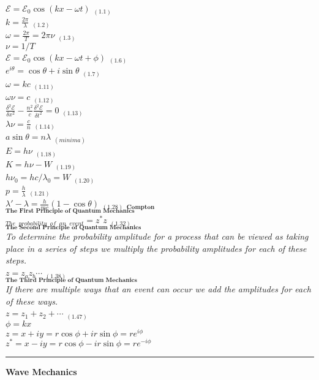 \documentclass[0pt]{report}
\begin{document}
\begin{multicols}{3}
\begin{flushleft}
$\mathcal{E}=\mathcal{E}_0\cos(kx-\omega t)$ $_{(1.1)}$\\
$k=\frac{2\pi}{\lambda}$ $_{(1.2)}$\\
$\omega=\frac{2\pi}{T}=2\pi\nu$ $_{(1.3)}$\\
$\nu=1/T$\\
$\mathcal{E}=\mathcal{E}_0\cos(kx-\omega t+\phi)$ $_{(1.6)}$\\
$e^{i\theta}=\cos\theta+i\sin\theta$ $_{(1.7)}$\\
$\omega=kc$ $_{(1.11)}$\\
$\omega\nu=c$ $_{(1.12)}$\\
$\frac{\delta^2\mathcal{E}}{\delta x^2}-\frac{n^2}{c}\frac{\delta^2\mathcal{E}}{\delta t^2}=0$ $_{(1.13)}$\\
$\lambda\nu=\frac{c}{n}$ $_{(1.14)}$\\
$a\sin\theta=n\lambda$ $_{(minima)}$\\
$E=h\nu$ $_{(1.18)}$\\
$K=h\nu-W$ $_{(1.19)}$\\
$h\nu_0=hc/\lambda_0=W$ $_{(1.20)}$\\
$p=\frac{h}{\lambda}$ $_{(1.21)}$\\
$\lambda'-\lambda=\frac{h}{mc}(1-\cos\theta)$ $_{(1.28)}$ $_{\textbf{Compton}}$\\
$_{\textbf{The First Principle of Quantum Mechanics}}$\\
$_{The}$ $_{probability}$  $_{of}$  $_{an}$ $_{event}=z^*z$ $_{(1.32)}$\\
$_{\textbf{The Second Principle of Quantum Mechanics}}$\\
\textit{To determine the probability amplitude for a process that can be viewed as taking place in a series of steps we multiply the probability amplitudes for each of these steps.}\\
$z=z_az_b\cdots$ $_{(1.38)}$\\
$_{\textbf{The Third Principle of Quantum Mechanics}}$\\
\textit{If there are multiple ways that an event can occur we add the amplitudes for each of these ways.}\\
$z=z_1+z_2+\cdots$ $_{(1.47)}$\\
$\phi=kx$\\
$z=x+iy=r\cos\phi+ir\sin\phi=re^{i\phi}$\\
$z^*=x-iy=r\cos\phi-ir\sin\phi=re^{-i\phi}$\\

\noindent\rule[0.5ex]{\linewidth}{1pt}
\textbf{Wave Mechanics}\\


\end{flushleft}
\end{multicols}
\end{document}
